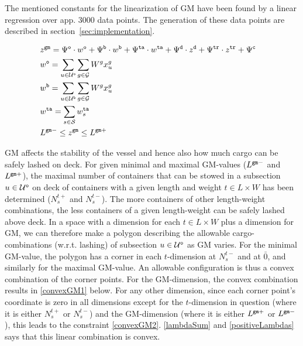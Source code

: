 The mentioned constants for the linearization of GM have been found by a linear regression over app. 3000 data points. %
The generation of these data points are described in section~\ref{sec:implementation}. %

\begin{alignat}{3}    
&z^{\ttt{gm}} = \Psi^{\ttt{o}}\cdot w^\ttt{o} + \Psi^{\ttt{b}}\cdot w^\ttt{b} + \Psi^{\ttt{ta}} \cdot w^\ttt{ta}
+ \Psi^{\ttt{d}} \cdot z^{\ttt{d}} + \Psi^{\ttt{tr}} \cdot z^{\ttt{tr}} + \Psi^{\ttt{c}}\quad			\label{defGM}\\
%
&w^\ttt{o} = \sum_{u\in \mc{U}^\ttt{o}}\sum_{g\in \mc{G}} W^g x^{g}_{u}	 													\label{defWo} \\
&w^\ttt{b} = \sum_{u\in \mc{U}^\ttt{b}}\sum_{g\in \mc{G}} W^g x^{g}_{u} 													\label{defWu} \\
%
&w^\ttt{ta} = \sum_{s\in\mc{S}} w^{\ttt{ta}}_{s} 																									\label{defWT} \\
%
&L^{\ttt{gm}-} \leq z^{\ttt{gm}}	\leq L^{\ttt{gm}+}																							\label{minGM}
\end{alignat}    

GM affects the stability of the vessel and hence also how much cargo can be safely lashed on deck. For given minimal and maximal GM-values ($L^{\texttt{gm}-}$ and $L^{\texttt{gm}+}$), the maximal number of containers that can be stowed in a subsection $u\in \mathcal{U}^\texttt{o}$ on deck of containers with a given length and weight $t\in L\times W$ has been determined ($N^{t+}_{s}$ and $N^{t-}_{s}$). The more containers of other length-weight combinations, the less containers of a given length-weight can be safely lashed above deck. 
In a space with a dimension for each $t\in L\times W$ plus a dimension for GM, we can therefore make a polygon describing the allowable cargo-combinations (w.r.t. lashing) of subsection $u\in\mathcal{U}^\texttt{o}$ as GM varies. For the minimal GM-value, the polygon has a corner in each $t$-dimension at $N^{t-}_{s}$ and at $\bar{0}$, and similarly for the maximal GM-value. %
An allowable configuration is thus a convex combination of the corner points. %
For the GM-dimension, the convex combination results in \eqref{convexGM1} below. For any other dimension, since each corner point's coordinate is zero in all dimensions except for the $t$-dimension in question (where it is either $N^{t+}_{s}$ or $N^{t-}_{s}$) and the GM-dimension (where it is either $L^{\texttt{gm}+}$ or $L^{\texttt{gm}-}$), this leads to the constraint \eqref{convexGM2}.  \eqref{lambdaSum} and \eqref{positiveLambdas} says that this linear combination is convex. 

